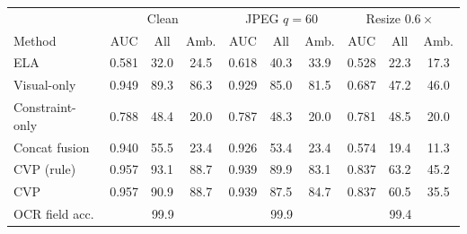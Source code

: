 \begin{tabular}{lccccccccc}
\toprule
 & \multicolumn{3}{c}{Clean} & \multicolumn{3}{c}{JPEG $q{=}60$} & \multicolumn{3}{c}{Resize $0.6\times$}\\
Method & AUC & All & Amb. & AUC & All & Amb. & AUC & All & Amb.\\
\midrule
ELA & 0.581 & 32.0 & 24.5 & 0.618 & 40.3 & 33.9 & 0.528 & 22.3 & 17.3\\
Visual-only & 0.949 & 89.3 & 86.3 & 0.929 & 85.0 & 81.5 & 0.687 & 47.2 & 46.0\\
Constraint-only & 0.788 & 48.4 & 20.0 & 0.787 & 48.3 & 20.0 & 0.781 & 48.5 & 20.0\\
Concat fusion & 0.940 & 55.5 & 23.4 & 0.926 & 53.4 & 23.4 & 0.574 & 19.4 & 11.3\\
CVP (rule) & 0.957 & 93.1 & 88.7 & 0.939 & 89.9 & 83.1 & 0.837 & 63.2 & 45.2\\
CVP & 0.957 & 90.9 & 88.7 & 0.939 & 87.5 & 84.7 & 0.837 & 60.5 & 35.5\\
\midrule
OCR field acc. & \multicolumn{3}{c}{99.9} & \multicolumn{3}{c}{99.9} & \multicolumn{3}{c}{99.4}\\
\bottomrule
\end{tabular}
